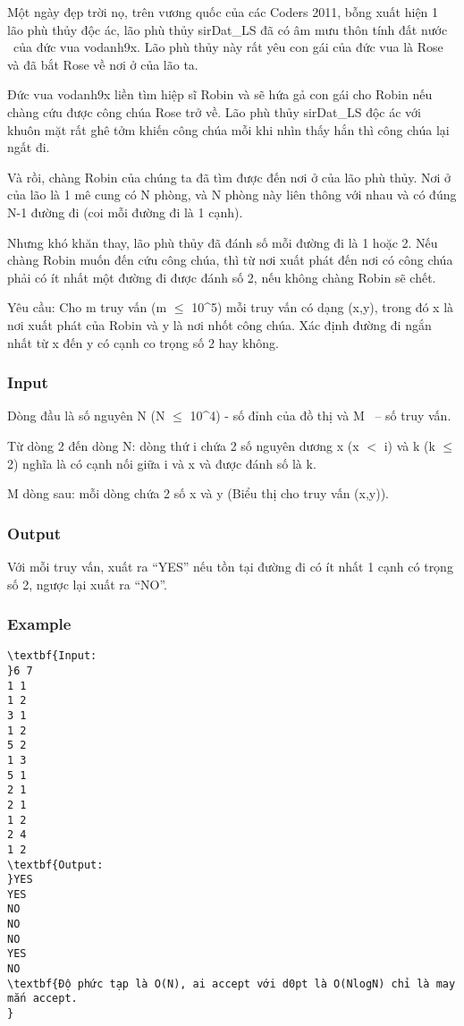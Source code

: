 

Một ngày đẹp trời nọ, trên vương quốc của các Coders 2011, bỗng xuất hiện 1 lão phù thủy độc ác, lão phù thủy sirDat\_LS đã có âm mưu thôn tính đất nước  của đức vua vodanh9x. Lão phù thủy này rất yêu con gái của đức vua là Rose và đã bắt Rose về nơi ở của lão ta.

Đức vua vodanh9x liền tìm hiệp sĩ Robin và sẽ hứa gả con gái cho Robin nếu chàng cứu được công chúa Rose trở về. Lão phù thủy sirDat\_LS độc ác với khuôn mặt rất ghê tởm khiến công chúa mỗi khi nhìn thấy hắn thì công chúa lại ngất đi.

Và rồi, chàng Robin của chúng ta đã tìm được đến nơi ở của lão phù thủy. Nơi ở của lão là 1 mê cung có N phòng, và N phòng này liên thông với nhau và có đúng N-1 đường đi (coi mỗi đường đi là 1 cạnh).

Nhưng khó khăn thay, lão phù thủy đã đánh số mỗi đường đi là 1 hoặc 2. Nếu chàng Robin muốn đến cứu công chúa, thì từ nơi xuất phát đến nơi có công chúa phải có ít nhất một đường đi được đánh số 2, nếu không chàng Robin sẽ chết.

Yêu cầu: Cho m truy vấn (m  $\le$  10^5) mỗi truy vấn có dạng (x,y), trong đó x là nơi xuất phát của Robin và y là nơi nhốt công chúa. Xác định đường đi ngắn nhất từ x đến y có cạnh co trọng số 2 hay không.

\subsubsection{Input}

Dòng đầu là số nguyên N (N  $\le$  10^4) - số đỉnh của đồ thị và M  – số truy vấn.

Từ dòng 2 đến dòng N: dòng thứ i chứa 2 số nguyên dương x (x $<$ i) và k (k  $\le$  2) nghĩa là có cạnh nối giữa i và x và được đánh số là k.

M dòng sau: mỗi dòng chứa 2 số x và y (Biểu thị cho truy vấn (x,y)).

\subsubsection{Output}

Với mỗi truy vấn, xuất ra “YES” nếu tồn tại đường đi có ít nhất 1 cạnh có trọng số 2, ngược lại xuất ra “NO”.

\subsubsection{Example}
\begin{verbatim}
\textbf{Input:
}6 7
1 1
1 2
3 1
1 2
5 2
1 3
5 1
2 1
2 1
1 2
2 4
1 2
\textbf{Output: 
}YES
YES
NO
NO
NO
YES
NO
\textbf{Độ phức tạp là O(N), ai accept với d0pt là O(NlogN) chỉ là may mắn accept.
}\end{verbatim}

